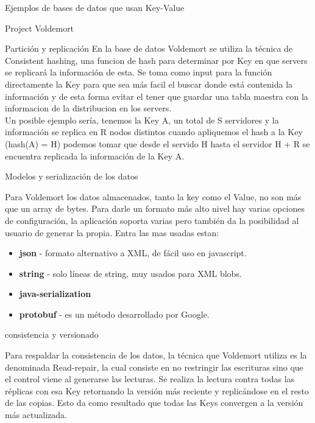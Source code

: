 \begin{section}{Ejemplos de bases de datos que usan Key-Value}
\begin{subsection}{Project Voldemort}
\begin{subsubsection}{Partición y replicación}
En la base de datos Voldemort se utiliza la técnica de Consistent hashing, una funcion de hash para determinar por Key en que servers se replicará la información de esta. Se toma como input para la función directamente la Key para que sea más facil el buscar donde está contenida la información y de esta forma evitar el tener que guardar una tabla maestra con la informacion de la distribucion en los servers. \\

Un posible ejemplo sería, tenemos la Key A, un total de S servidores y la información se replica en R nodos distintos cuando apliquemos el hash a la Key (hash(A) = H) podemos tomar que desde el servido H hasta el servidor H + R se encuentra replicada la información de la Key A.\\

\end{subsubsection}

\begin{subsubsection}{Modelos y serialización de los datos}

Para Voldemort los datos almacenados, tanto la key como el Value, no son más que un array de bytes. Para darle un formato más alto nivel hay varias opciones de configuración, la aplicación soporta varias pero también da la posibilidad al usuario de generar la propia. Entra las mas usadas estan:\\

\begin{itemize}

\item \textbf{json} - formato alternativo a XML, de fácil uso en javascript.
\item \textbf{string} - solo líneas de string, muy usados para XML blobs.
\item \textbf{java-serialization}
\item \textbf{protobuf} - es un método desarrollado por Google.

\end{itemize}

\end{subsubsection}

\begin{subsubsection}{consistencia y versionado}

Para respaldar la consistencia de los datos, la técnica que Voldemort utiliza es la denominada Read-repair, la cual consiste en no restringir las escrituras sino que el control viene al generarse las lecturas. Se realiza la lectura contra todas las réplicas con esa Key retornando la versión más reciente y replicándose en el resto de las copias. Esto da como resultado que todas las Keys convergen a la versión más actualizada.\\


\end{subsubsection}
\end{subsection}
\end{section}
